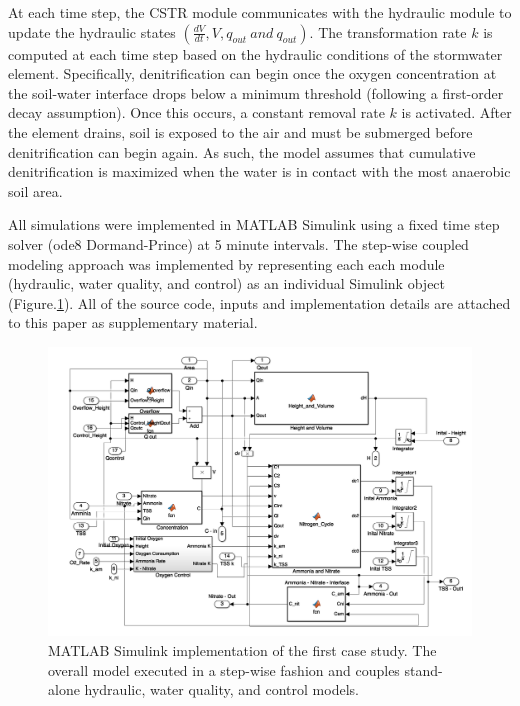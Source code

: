 At each time step, the CSTR module communicates with the hydraulic module to update the hydraulic states $( \frac{dV}{dt}, V , q_{out} \ and \ q_{out})$. The transformation rate $k$ is computed at each time step based on the hydraulic conditions of the stormwater element. Specifically, denitrification can  begin once the oxygen concentration at the soil-water interface drops below a minimum threshold (following a first-order decay assumption). Once this occurs, a constant removal rate $k$ is activated. After the element drains, soil is exposed to the air and must be submerged before denitrification can begin again. As such, the model assumes that cumulative denitrification is maximized when the water is in contact with the most anaerobic soil area. 

All simulations were implemented in MATLAB Simulink\cite{TheMathWorksInc.MATLAB} using a fixed time step solver (ode8 Dormand-Prince\cite{Dormand1980AFormulae}) at 5 minute intervals. 
The step-wise coupled modeling approach was implemented by representing each  each module (hydraulic, water quality, and control) as an individual Simulink object (Figure.\ref{fgr:simulink}). All of the source code, inputs and implementation details are attached to this paper as supplementary material.

\begin{figure}
\includegraphics[width=\linewidth]{gfx/Chapter-1/Model_Individual.png}
  \caption{MATLAB Simulink implementation of the first case study. The overall model executed in a step-wise fashion and couples stand-alone hydraulic, water quality, and control models.}
\label{fgr:simulink}
\end{figure}

